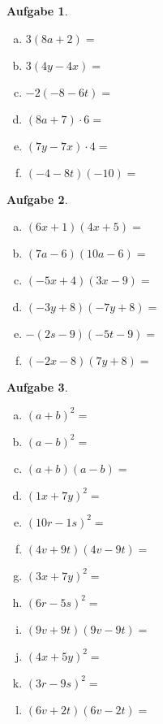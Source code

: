 \documentclass[12pt,fleqn]{article}
\theoremstyle{aufg}
\newtheorem{aufgabe}{Aufgabe}
\theoremstyle{bsp}
\begin{document}
\begin{flushleft}
\begin{aufgabe} ~ \\ 
\begin{multicols}{3} 
\begin{enumerate}[a)] 
\item 
$3(8a+2)=$
\item 
$3(4y-4x)=$
\item 
$-2(-8-6t)=$
\item 
$(8a+7)\cdot 6=$
\item 
$(7y-7x)\cdot 4=$
\item 
$(-4-8t)(-10)=$
\end{enumerate} 
\end{multicols} 
\end{aufgabe} 
\begin{aufgabe} ~ \\ 
\begin{multicols}{3} 
\begin{enumerate}[a)] 
\item 
$(6x+1)(4x+5)=$
\item 
$(7a-6)(10a-6)=$
\item 
$(-5x+4)(3x-9)=$
\item 
$(-3y+8)(-7y+8)=$
\item 
$-(2s-9)(-5t-9)=$
\item 
$(-2x-8)(7y+8)=$
\end{enumerate} 
\end{multicols} 
\end{aufgabe} 
\begin{aufgabe} ~ \\ 
\begin{multicols}{3} 
\begin{enumerate}[a)] 
\item 
$(a+b)^2=$
\item 
$(a-b)^2=$
\item 
$(a+b)(a-b)=$
\item 
$(1x+7y)^2=$
\item 
$(10r-1s)^2=$
\item 
$(4v+9t)(4v-9t)=$
\item 
$(3x+7y)^2=$
\item 
$(6r-5s)^2=$
\item 
$(9v+9t)(9v-9t)=$
\item 
$(4x+5y)^2=$
\item 
$(3r-9s)^2=$
\item 
$(6v+2t)(6v-2t)=$
\end{enumerate} 
\end{multicols} 
\end{aufgabe} 
\end{flushleft} 
\end{document}
